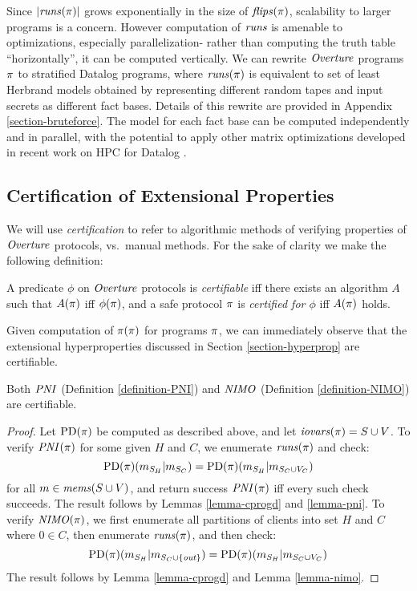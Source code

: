 Since $|\mathit{runs}(\pi)|$ grows exponentially in the size of
$\mathit{flips}(\pi)$, scalability to larger programs is a concern.  However
computation of $\mathit{runs}$ is amenable to optimizations, especially
parallelization- rather than computing the truth table
``horizontally'', it can be computed vertically. We can rewrite
$\mathit{Overture}$ programs $\pi$ to stratified Datalog programs, where
$\mathit{runs}(\pi)$ is equivalent to set of least Herbrand models obtained
by representing different random tapes and input secrets as different
fact bases. Details of this rewrite are provided in Appendix
\ref{section-bruteforce}. The model for each fact base can be computed
independently and in parallel, with the potential to apply other
matrix optimizations developed in recent work on HPC for Datalog
\cite{sakama2017linear,aspis2018linear,nguyen2022enhancing,nguyen2021efficient}.

\subsection{Certification of Extensional Properties}

We will use \emph{certification} to refer to algorithmic methods of
verifying properties of $\mathit{Overture}$ protocols, vs.~manual methods. For
the sake of clarity we make the following definition:
\begin{definition}
  A predicate $\phi$ on $\mathit{Overture}$ protocols is \emph{certifiable} iff
  there exists an algorithm $A$ such that $A(\pi)$ iff $\phi(\pi)$,
  and a safe protocol $\pi$ is \emph{certified for $\phi$} iff
  $A(\pi)$ holds.
\end{definition}

Given computation of $\pi(\pi)$ for programs $\pi$, we can
immediately observe that the extensional hyperproperties discussed in
Section \ref{section-hyperprop} are certifiable.
\begin{lemma}
  Both $\mathit{PNI}$ (Definition \ref{definition-PNI}) and $\mathit{NIMO}$ (Definition \ref{definition-NIMO}) are certifiable. 
\end{lemma}

\begin{proof}
  Let $\mathrm{PD}(\pi)$ be computed as described above, and let $\mathit{iovars}(\pi) = S
  \cup V$. To verify $\mathit{PNI}(\pi)$ for
  some given $H$ and $C$, we enumerate $\mathit{runs}(\pi)$ and check:
  $$
  \mathrm{PD}(\pi)(m_{S_H}|m_{S_C}) =
  \mathrm{PD}(\pi)(m_{S_H}|m_{S_C \cup V_C})
  $$
  for all $m \in \mathit{mems}(S \cup V)$, and return success $\mathit{PNI}(\pi)$ iff every such
  check succeeds. The result follows by Lemmas \ref{lemma-cprogd} and \ref{lemma-pni}.
  To verify $\mathit{NIMO}(\pi)$, we first enumerate all partitions of clients
  into set $H$ and $C$ where $0 \in C$, then enumerate $\mathit{runs}(\pi)$, and
  then check:
  $$
  \mathrm{PD}(\pi)(m_{S_H}|m_{S_C \cup \{\mathit{out}\}}) =
  \mathrm{PD}(\pi)(m_{S_H}|m_{S_C \cup V_C})
  $$
  The result follows by Lemma \ref{lemma-cprogd} and Lemma \ref{lemma-nimo}.
\end{proof}

